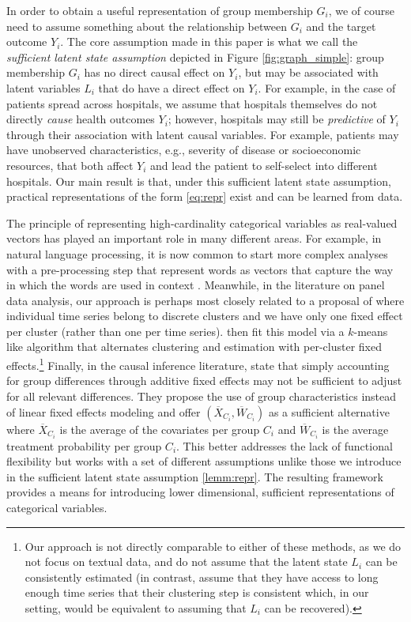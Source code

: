 \documentclass{article}
\theoremstyle{plain}
\theoremstyle{definition}
\theoremstyle{remark}
\begin{document}
In order to obtain a useful representation of group membership $G_i$, we of course need to assume
something about the relationship between $G_i$ and the target outcome $Y_i$. The core assumption
made in this paper is what we call the \emph{sufficient latent state assumption} depicted in Figure
\ref{fig:graph_simple}: group membership $G_i$ has no direct causal effect on $Y_i$, but may be
associated with latent variables $L_i$ that do have a direct effect on $Y_i$.
For example, in the case of patients spread across hospitals, we assume that hospitals themselves do not
directly \emph{cause} health outcomes $Y_i$; however, hospitals may still be \emph{predictive} of
$Y_i$ through their association with latent causal variables. For example, patients may have unobserved
characteristics, e.g., severity of disease or socioeconomic resources, that both affect $Y_i$ and lead the
patient to self-select into different hospitals. Our main result is that, under this sufficient latent state
assumption, practical representations of the form \eqref{eq:repr} exist and can be learned from data.

The principle of representing high-cardinality categorical variables as real-valued vectors has played
an important role in many different areas. For example, in natural language processing, it is now common
to start more complex analyses with a pre-processing step that represent words as vectors that capture
the way in which the words are used in context \citep{mikolov2013efficient,pennington2014glove}.
Meanwhile, in the literature on panel data analysis, our approach is perhaps most closely related
to a proposal of \citet{bonhomme2015grouped} where individual time series belong to discrete clusters and we
have only one fixed effect per cluster (rather than one per time series). \citet{bonhomme2015grouped} then fit
this model via a $k$-means like algorithm that alternates clustering and estimation with per-cluster fixed
effects.\footnote{Our approach is not directly comparable to either of these methods, as we do not focus on
textual data, and do not assume that the latent state $L_i$ can be consistently estimated (in contrast,
\citet{bonhomme2015grouped} assume that they have access to long enough time series that their
clustering step is consistent which, in our setting, would be equivalent to assuming that $L_i$ can be recovered).} Finally, in the causal inference literature, \cite{arkhangelsky2018role} state that simply accounting for group differences through additive fixed effects may not be sufficient to adjust for all relevant differences. They propose the use of group characteristics instead of linear fixed effects modeling and offer $(\overline{X}_{C_i},\overline{W}_{C_i})$ as a sufficient alternative where $\overline{X}_{C_i}$ is the average of the covariates per group $C_i$ and $\overline{W}_{C_i}$ is the average treatment probability per group $C_i$. This better addresses the lack of functional flexibility but works with a set of different assumptions unlike those we introduce in the sufficient latent state assumption \ref{lemm:repr}. The resulting framework provides a means for introducing lower dimensional, sufficient representations of categorical variables.
\end{document}
